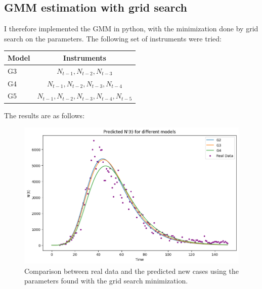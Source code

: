\newpage

\subsection{GMM estimation with grid search}

    I therefore implemented the GMM in python, with the minimization done by grid search on the parameters.
    The following set of instruments were tried:

    \begin{table}[h!]
        \centering
        \begin{tabular}{l c}
            Model & Instruments \\ \hline
            G3 & $N_{t-1}, N_{t-2}, N_{t-3}$ \\
            G4 & $N_{t-1}, N_{t-2}, N_{t-3}, N_{t-4}$ \\
            G5 & $N_{t-1}, N_{t-2}, N_{t-3}, N_{t-4}, N_{t-5}$
        \end{tabular}
        \label{tab:models_grid_search}
    \end{table}

    The results are as follows:
    

    \begin{figure}[h!]
        \centering
        \includegraphics[width=0.8\linewidth]{plots/gmm_grid_search}
        \caption{Comparison between real data and the predicted new cases using the parameters found with the grid search minimization.}
        \label{fig:plot_gmm_grid_search}
    \end{figure}

    \newpage
